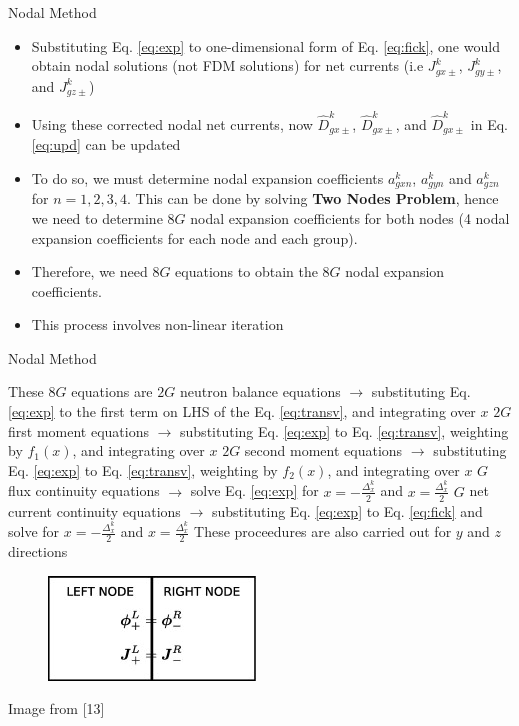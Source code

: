 \documentclass{beamer}
\begin{document}
\begin{frame}{Nodal Method}
  \begin{itemize}
  \item Substituting Eq. \eqref{eq:exp} to one-dimensional form of Eq. \eqref{eq:fick}, one would obtain nodal solutions (not FDM solutions) for net currents (i.e $J_{gx \pm }^k$, $J_{gy \pm }^k$, and $J_{gz \pm }^k$)
  \item Using these corrected nodal net currents, now $\widehat{D}_{gx \pm }^k$, $\widehat{D}_{gx \pm }^k$, and $\widehat{D}_{gx \pm }^k$ in Eq. \eqref{eq:upd} can be updated
  \item To do so, we must determine nodal expansion coefficients $a_{gxn}^k$, $a_{gyn}^k$ and $a_{gzn}^k$ for $n=1,2,3,4$. This can be done by solving \textbf{Two Nodes Problem}, hence we need to determine $8G$ nodal expansion coefficients for both nodes (4 nodal expansion coefficients for each node and each group).
  \item Therefore, we need $8G$ equations to obtain the $8G$ nodal expansion coefficients.
  \item This process involves non-linear iteration
  \end{itemize}
\end{frame}


\begin{frame}{Nodal Method}
  \begin{outline}
  \1 These $8G$ equations are
    \2 $2G$ neutron balance equations $\rightarrow$ substituting Eq. \eqref{eq:exp} to the first term on LHS of the Eq. \eqref{eq:transv}, and integrating over $x$
    \2 $2G$ first moment equations $\rightarrow$ substituting Eq. \eqref{eq:exp} to Eq. \eqref{eq:transv}, weighting by $f_1(x)$, and integrating over $x$
    \2 $2G$ second moment equations $\rightarrow$ substituting Eq. \eqref{eq:exp} to Eq. \eqref{eq:transv}, weighting by $f_2(x)$, and integrating over $x$
    \2 $G$ flux continuity equations $\rightarrow$ solve Eq. \eqref{eq:exp} for $x = -\frac{\Delta _x^k}{2}$ and $x = \frac{\Delta _x^k}{2}$
    \2 $G$ net current continuity equations $\rightarrow$ substituting Eq. \eqref{eq:exp} to Eq. \eqref{eq:fick} and solve for $x = -\frac{\Delta _x^k}{2}$ and $x = \frac{\Delta _x^k}{2}$
  \1 These proceedures are also carried out for $y$ and $z$ directions
  \end{outline}
  \begin{figure}
  \includegraphics[width=0.3\linewidth]{twonodes.jpg}
  \end{figure}
  Image from [13]
\end{frame}
\end{document}
